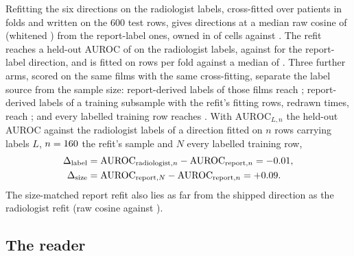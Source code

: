 \documentclass{article}
\begin{document}
Refitting the six directions on the radiologist labels, cross-fitted over patients in \cfValidfitFolds{} folds and written on the 600 test rows, gives directions at a median raw cosine of \cfValidfitCosRaw{} (whitened \cfValidfitCosWhitened{}) from the report-label ones, owned in \cfValidfitOwnedExpert{} of \cfValidfitCells{} cells against \cfValidfitOwnedReport{}. The refit reaches a held-out AUROC of \cfValidfitAurocExpert{} on the radiologist labels, against \cfValidfitAurocReportDir{} for the report-label direction, and is fitted on \cfVfArmExpertRows{} rows per fold against a median of \cfVfArmReportFullRows{}. Three further arms, scored on the same films with the same cross-fitting, separate the label source from the sample size: report-derived labels of those \cfVfArmRows{} films reach \cfVfArmReportSameFilmsAuroc{}; report-derived labels of a training subsample with the refit's \cfVfArmReportSubRows{} fitting rows, redrawn \cfVfArmDraws{} times, reach \cfVfArmReportSubAuroc{}; and every labelled training row reaches \cfVfArmReportFullAuroc{}. With $\mathrm{AUROC}_{L,n}$ the held-out AUROC against the radiologist labels of a direction fitted on $n$ rows carrying labels $L$, $n=160$ the refit's sample and $N$ every labelled training row,
\begin{equation}
\begin{aligned}
\Delta_{\text{label}}&=\mathrm{AUROC}_{\text{radiologist},n}-\mathrm{AUROC}_{\text{report},n}=-0.01,\\
\Delta_{\text{size}}&=\mathrm{AUROC}_{\text{report},N}-\mathrm{AUROC}_{\text{report},n}=+0.09 .
\end{aligned}
\label{eq:label-size}
\end{equation}
The size-matched report refit also lies as far from the shipped direction as the radiologist refit (raw cosine \cfVfArmReportSubCos{} against \cfVfArmExpertCos{}).

\subsection{The reader}
\label{app:cf-reader}
\end{document}
